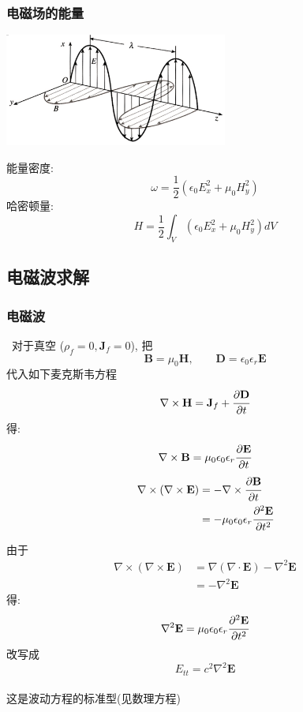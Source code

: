 \begin{frame}
    \frametitle{电磁场的能量}
      \begin{center}
           \includegraphics[width=0.55\textwidth]{figs/43.png}
      \end{center}
      能量密度: 
      \[ \omega = \frac{1}{2} (\epsilon_0 E^2 _x + \mu_0 H^2 _y) \]
      哈密顿量: \[ H = \frac{1}{2} \int_V (\epsilon_0 E^2 _x + \mu_0 H^2 _y) dV \]
\end{frame}

\subsection*{电磁波求解}

\begin{frame}
      \frametitle{电磁波} 
       对于真空 ($\rho _f =0, \mathbf{J}_f =0 $), 把 \[ \mathbf{B} = \mu_0 \mathbf{H}, \qquad  \mathbf{D} = \epsilon_0 \epsilon_r \mathbf{E} \]
      代入如下麦克斯韦方程
       \[ \nabla \times  \mathbf{H} = \mathbf{J}_f +  \cfrac{\partial \mathbf{D}}{\partial t } \]
      得: \[ \nabla \times \mathbf{B} = \mu_0\epsilon_0 \epsilon_r \cfrac{\partial \mathbf{E}} {\partial t } \]
    \[
    \begin{aligned}
        \nabla \times (\nabla \times  \mathbf{E}) &= - \nabla \times \cfrac{\partial \mathbf{B}}{\partial t } \\
        &= - \mu_0\epsilon_0 \epsilon_r \cfrac{\partial ^2 \mathbf{E}} {\partial t^2 }
    \end{aligned} \]
\end{frame}

\begin{frame}{}
由于
  \[
  \begin{aligned}
      \nabla \times (\nabla \times  \mathbf{E}) &=  \nabla (\nabla \cdot  \mathbf{E})- \nabla^2 \mathbf{E} \\
      &= - \nabla^2 \mathbf{E} 
  \end{aligned} \]
  得:
  \[
  \nabla^2 \mathbf{E}= \mu_0\epsilon_0 \epsilon_r \cfrac{\partial ^2 \mathbf{E}} {\partial t^2 }\]
  改写成
  \[\boxed{E_{tt} =c^2\nabla^2 \mathbf{E}}\]
  ~~\\
  这是波动方程的标准型(见数理方程)
\end{frame}


